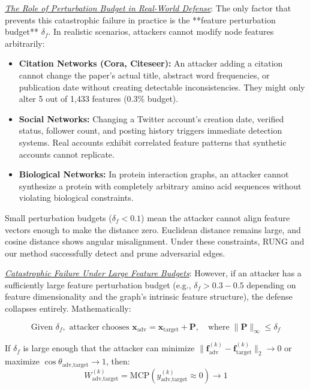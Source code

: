\documentclass[sigconf]{acmart}
\begin{document}
\underline{\textit{The Role of Perturbation Budget in Real-World Defense}}: The only factor that prevents this catastrophic failure in practice is the **feature perturbation budget** $\delta_f$. In realistic scenarios, attackers cannot modify node features arbitrarily:

\begin{itemize}
\item \textbf{Citation Networks (Cora, Citeseer):} An attacker adding a citation cannot change the paper's actual title, abstract word frequencies, or publication date without creating detectable inconsistencies. They might only alter 5 out of 1,433 features (0.3\% budget).

\item \textbf{Social Networks:} Changing a Twitter account's creation date, verified status, follower count, and posting history triggers immediate detection systems. Real accounts exhibit correlated feature patterns that synthetic accounts cannot replicate.

\item \textbf{Biological Networks:} In protein interaction graphs, an attacker cannot synthesize a protein with completely arbitrary amino acid sequences without violating biological constraints.
\end{itemize}

Small perturbation budgets ($\delta_f < 0.1$) mean the attacker cannot align feature vectors enough to make the distance zero. Euclidean distance remains large, and cosine distance shows angular misalignment. Under these constraints, RUNG and our method successfully detect and prune adversarial edges.

\underline{\textit{Catastrophic Failure Under Large Feature Budgets}}: However, if an attacker has a sufficiently large feature perturbation budget (e.g., $\delta_f > 0.3-0.5$ depending on feature dimensionality and the graph's intrinsic feature structure), the defense collapses entirely. Mathematically:

$$\text{Given } \delta_f, \text{ attacker chooses } \mathbf{x}_{\text{adv}} = \mathbf{x}_{\text{target}} + \mathbf{P}, \quad \text{where} \; \|\mathbf{P}\|_\infty \leq \delta_f$$

If $\delta_f$ is large enough that the attacker can minimize $\|\mathbf{f}^{(k)}_{\text{adv}} - \mathbf{f}^{(k)}_{\text{target}}\|_2 \to 0$ or maximize $\cos\theta_{\text{adv},\text{target}} \to 1$, then:
$$W^{(k)}_{\text{adv},\text{target}} = \text{MCP}\left(y^{(k)}_{\text{adv},\text{target}} \approx 0\right) \to 1$$
\end{document}
